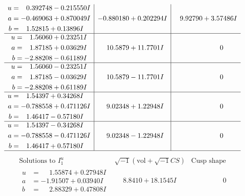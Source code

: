 \documentclass[1p]{elsarticle_modified}
\theoremstyle{definition}
\newcommand{\I}{\sqrt{-1}}
\begin{document}
$$\begin{array}{c|c|c}
\begin{aligned}
u &= \phantom{-}0.392748 - 0.215550 I \\
a &= -0.469063 + 0.870049 I \\
b &= \phantom{-}1.52815 + 0.13896 I\end{aligned}
 & -0.880180 + 0.202294 I & \phantom{-}9.92790 + 3.57486 I \\ \hline\begin{aligned}
u &= \phantom{-}1.56060 + 0.23251 I \\
a &= \phantom{-}1.87185 + 0.03629 I \\
b &= -2.88208 - 0.61189 I\end{aligned}
 & \phantom{-}10.5879 + 11.7701 I & \phantom{-0.000000 } 0 \\ \hline\begin{aligned}
u &= \phantom{-}1.56060 - 0.23251 I \\
a &= \phantom{-}1.87185 - 0.03629 I \\
b &= -2.88208 + 0.61189 I\end{aligned}
 & \phantom{-}10.5879 - 11.7701 I & \phantom{-0.000000 } 0 \\ \hline\begin{aligned}
u &= \phantom{-}1.54397 + 0.34268 I \\
a &= -0.788558 + 0.471126 I \\
b &= \phantom{-}1.46417 - 0.57180 I\end{aligned}
 & \phantom{-}9.02348 + 1.22948 I & \phantom{-0.000000 } 0 \\ \hline\begin{aligned}
u &= \phantom{-}1.54397 - 0.34268 I \\
a &= -0.788558 - 0.471126 I \\
b &= \phantom{-}1.46417 + 0.57180 I\end{aligned}
 & \phantom{-}9.02348 - 1.22948 I & \phantom{-0.000000 } 0\\
 \hline 
 \end{array}$$\newpage$$\begin{array}{c|c|c}  
\text{Solutions to }I^u_{1}& \I (\text{vol} + \sqrt{-1}CS) & \text{Cusp shape}\\
 \hline 
\begin{aligned}
u &= \phantom{-}1.55874 + 0.27948 I \\
a &= -1.91507 + 0.03940 I \\
b &= \phantom{-}2.88329 + 0.47808 I\end{aligned}
 & \phantom{-}8.8410 + 18.1545 I & \phantom{-0.000000 } 0 \\ \hline\begin{aligned}

\end{aligned}
\end{array}$$
\end{document}
